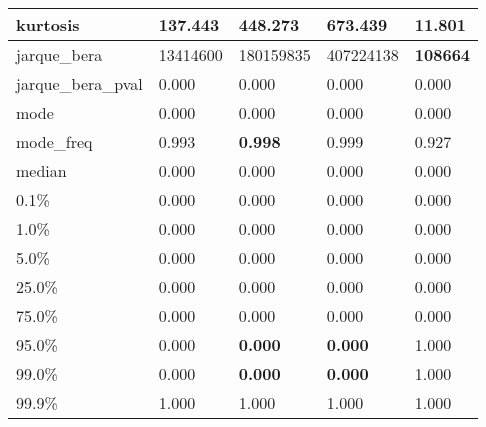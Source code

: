 \begin{table}[H]
\begin{tabular}{|l|m{10em}|m{10em}|m{10em}|m{10em}|}
\hline kurtosis & 137.443 & 448.273 & \cellcolor[rgb]{0.9, 0.54, 0.52} 673.439 & \bfseries 11.801 \\
\hline jarque\_bera & 13414600 & 180159835 & \cellcolor[rgb]{0.9, 0.54, 0.52} 407224138 & \bfseries 108664 \\
\hline jarque\_bera\_pval & 0.000 & 0.000 & 0.000 & 0.000 \\
\hline mode & 0.000 & 0.000 & 0.000 & 0.000 \\
\hline mode\_freq & 0.993 & \bfseries 0.998 & 0.999 & \cellcolor[rgb]{0.9, 0.54, 0.52} 0.927 \\
\hline median & 0.000 & 0.000 & 0.000 & 0.000 \\
\hline 0.1\% & 0.000 & 0.000 & 0.000 & 0.000 \\
\hline 1.0\% & 0.000 & 0.000 & 0.000 & 0.000 \\
\hline 5.0\% & 0.000 & 0.000 & 0.000 & 0.000 \\
\hline 25.0\% & 0.000 & 0.000 & 0.000 & 0.000 \\
\hline 75.0\% & 0.000 & 0.000 & 0.000 & 0.000 \\
\hline 95.0\% & 0.000 & \bfseries 0.000 & \bfseries 0.000 & \cellcolor[rgb]{0.9, 0.54, 0.52} 1.000 \\
\hline 99.0\% & 0.000 & \bfseries 0.000 & \bfseries 0.000 & \cellcolor[rgb]{0.9, 0.54, 0.52} 1.000 \\
\hline 99.9\% & 1.000 & 1.000 & 1.000 & 1.000 \\
\hline
\end{tabular}
\end{table}

